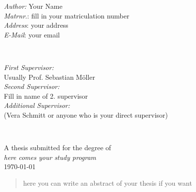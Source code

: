 \begin{titlepage}
\begin{minipage}{0.5\textwidth}
\begin{flushleft} \large
\emph{Author:} Your Name\\
\emph{Matrnr}.: fill in your matriculation number\\
\emph{Address}: your address \\
\emph{E-Mail}: your email\\
\end{flushleft}
\end{minipage}
~
\begin{minipage}{0.43\textwidth}
\begin{flushright} \large
\emph{First Supervisor:} \\
Usually Prof. Sebastian Möller\\
\emph{Second Supervisor:} \\
Fill in name of 2. supervisor\\
\emph{Additional Supervisor:}\\
(Vera Schmitt or anyone who is your direct supervisor)
\end{flushright}
\end{minipage}\\[3cm]
\makeatother


{\large A thesis submitted for the degree of}\\[0.5cm]
{\large \emph{here comes your study program}}\\[0.5cm]
{\large \today}\\[2cm] %

\vfill %
 


\begin{abstract}
\noindent
here you can write an abstract of your thesis if you want
\end{abstract}
\vspace{1cm}

\vfill %

\end{titlepage}
